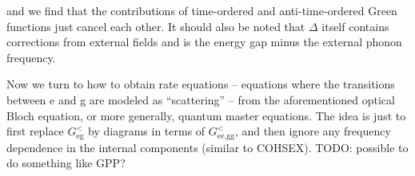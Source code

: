 \documentclass[hyperref, a4paper]{article}
\begin{document}
and we find that the contributions of time-ordered and anti-time-ordered Green functions
just cancel each other.
It should also be noted that $\Delta$ itself contains corrections from external fields
and is the energy gap minus the external phonon frequency.

Now we turn to how to obtain rate equations -- 
equations where the transitions between e and g are modeled as ``scattering'' -- 
from the aforementioned optical Bloch equation, 
or more generally, quantum master equations.
The idea is just to first replace $G^<_{\text{eg}}$ by diagrams in terms of $G^<_{\text{ee}, \text{gg}}$,
and then ignore any frequency dependence in the internal components
(similar to COHSEX).
TODO: possible to do something like GPP?
\end{document}
